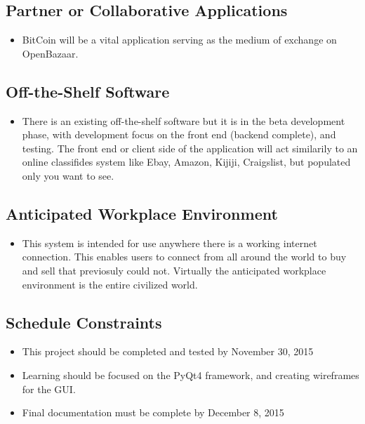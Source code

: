 \documentclass{article}
\begin{document}
\subsection{Partner or Collaborative Applications}
\begin{itemize}

\item
BitCoin will be a vital application serving as the medium of exchange on OpenBazaar.

\end{itemize}

\subsection{Off-the-Shelf Software}
\begin{itemize}
	
\item
There is an existing off-the-shelf software but it is in the beta development phase, with development focus on the front end (backend complete), and testing. The front end or client side of the application will act similarily to an online classifides system like Ebay, Amazon, Kijiji, Craigslist, but populated only you want to see.	

	
\end{itemize}

\subsection{Anticipated Workplace Environment}
\begin{itemize}
	
\item
This system is intended for use anywhere there is a working internet connection. This enables users to connect from all around the world to buy and sell that previosuly could not. Virtually the anticipated workplace environment is the entire civilized world.
	
	
\end{itemize}

\subsection{Schedule Constraints}
\begin{itemize}
	
\item
This project should be completed and tested by November 30, 2015
\item
Learning should be focused on the PyQt4 framework, and creating wireframes for the GUI.
\item
Final documentation must be complete by December 8, 2015
	
\end{itemize}
\end{document}
